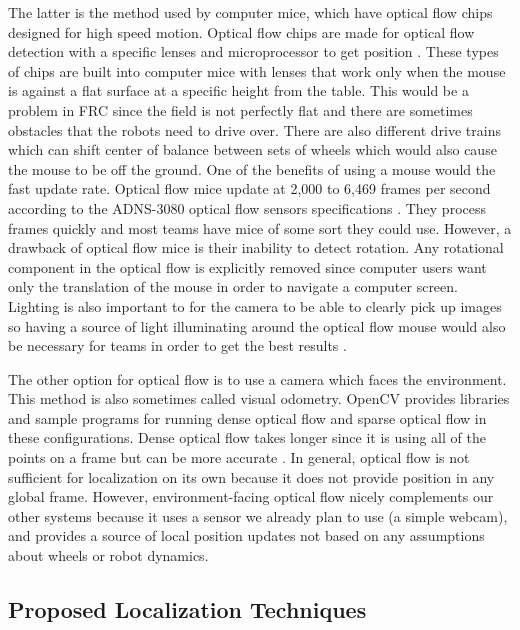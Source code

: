 \documentclass{article}
\begin{document}
  The latter is the method used by computer mice, which have optical flow chips designed for high speed motion. Optical flow chips are made for optical flow detection with a specific lenses and microprocessor to get position \cite{font_characterization_2011}. These types of chips are built into computer mice with lenses that work only when the mouse is against a flat surface at a specific height from the table. This would be a problem in FRC since the field is not perfectly flat and there are sometimes obstacles that the robots need to drive over. There are also different drive trains which can shift center of balance between sets of wheels which would also cause the mouse to be off the ground. One of the benefits of using a mouse would the fast update rate. Optical flow mice update at 2,000 to 6,469 frames per second according to the ADNS-3080 optical flow sensors specifications \cite{sun_optical_2008}. They process frames quickly and most teams have mice of some sort they could use. However, a drawback of optical flow mice is their inability to detect rotation. Any rotational component in the optical flow is explicitly removed since computer users want only the translation of the mouse in order to navigate a computer screen. Lighting is also important to for the camera to be able to clearly pick up images so having a source of light illuminating around the optical flow mouse would also be necessary for teams in order to get the best results \cite{font_characterization_2011}.

  The other option for optical flow is to use a camera which faces the environment. This method is also sometimes called visual odometry. OpenCV provides libraries and sample programs for running dense optical flow and sparse optical flow in these configurations. Dense optical flow takes longer since it is using all of the points on a frame but can be more accurate \cite{itseez_opencv_2017}. In general, optical flow is not sufficient for localization on its own because it does not provide position in any global frame. However, environment-facing optical flow nicely complements our other systems because it uses a sensor we already plan to use (a simple webcam), and provides a source of local position updates not based on any assumptions about wheels or robot dynamics.

  \subsection{Proposed Localization Techniques} \label{section:proposed_techniques}
\end{document}
